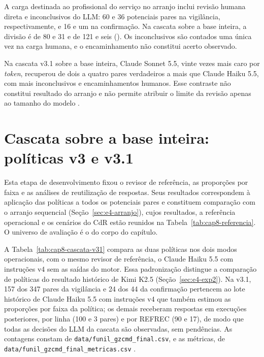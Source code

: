 A carga destinada ao profissional do serviço no arranjo inclui revisão humana direta e inconclusivos do LLM: 60 e 36 potenciais pares na vigilância, respectivamente, e 16 e um na confirmação. Na cascata sobre a base inteira, a divisão é de 80 e 31 e de 121 e seis (). Os inconclusivos são contados uma única vez na carga humana, e o encaminhamento não constitui acerto observado.

Na cascata v3.1 sobre a base inteira, Claude Sonnet 5.5, vinte vezes mais caro por \textit{token}, recuperou de dois a quatro pares verdadeiros a mais que Claude Haiku 5.5, com mais inconclusivos e encaminhamentos humanos. Esse contraste não constitui resultado do arranjo e não permite atribuir o limite da revisão apenas ao tamanho do modelo \cite{Jardim2026phdrepo}.

\section{Cascata sobre a base inteira: políticas v3 e v3.1}\label{sec:e4-ap-cascata}\label{sec:e4-cascata}

Esta etapa de desenvolvimento fixou o revisor de referência, as proporções por faixa e as análises de reutilização de respostas. Seus resultados correspondem à aplicação das políticas a todos os potenciais pares e constituem comparação com o arranjo sequencial (Seção~\ref{sec:e4-arranjo}), cujos resultados, a referência operacional e os cenários do CdR estão reunidos na Tabela~\ref{tab:cap8-referencia}. O universo de avaliação é o do corpo do capítulo.

A Tabela~\ref{tab:cap8-cascata-v31} compara as duas políticas nos dois modos operacionais, com o mesmo revisor de referência, o Claude Haiku 5.5 com instruções v4 sem as saídas do motor. Essa padronização distingue a comparação de políticas do resultado histórico de Kimi K2.5 (Seção~\ref{sec:e4-exp2}). Na v3.1, 157 dos 347 pares da vigilância e 24 dos 44 da confirmação pertencem ao lote histórico de Claude Haiku 5.5 com instruções v4 que também estimou as proporções por faixa da política; os demais receberam respostas em execuções posteriores, por linha (100 e 3 pares) e por REFREC (90 e 17), de modo que todas as decisões do LLM da cascata são observadas, sem pendências. As contagens constam de \texttt{data/funil\_gzcmd\_final.csv}, e as métricas, de \texttt{data/funil\_gzcmd\_final\_metricas.csv} \cite{Jardim2026phdrepo}.



